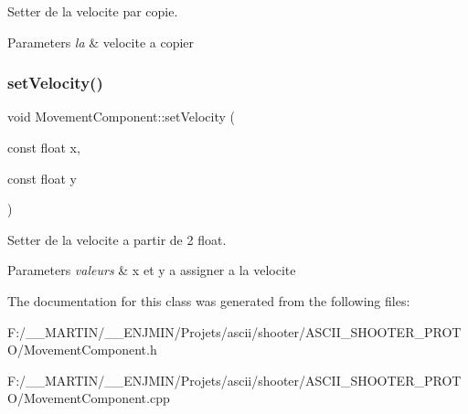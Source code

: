 Setter de la velocite par copie. 


\begin{DoxyParams}{Parameters}
{\em la} & velocite a copier \\
\hline
\end{DoxyParams}
\hypertarget{class_movement_component_add7629692ed68862ff1fd1f3515e2ea6}{}\label{class_movement_component_add7629692ed68862ff1fd1f3515e2ea6} 
\subsubsection{\texorpdfstring{set\+Velocity()}{setVelocity()}\hspace{0.1cm}{\footnotesize\ttfamily [2/2]}}
{\footnotesize\ttfamily void Movement\+Component\+::set\+Velocity (\begin{DoxyParamCaption}\item[{const float}]{x,  }\item[{const float}]{y }\end{DoxyParamCaption})\hspace{0.3cm}{\ttfamily [inline]}}



Setter de la velocite a partir de 2 float. 


\begin{DoxyParams}{Parameters}
{\em valeurs} & x et y a assigner a la velocite \\
\hline
\end{DoxyParams}


The documentation for this class was generated from the following files\+:\begin{DoxyCompactItemize}
\item 
F\+:/\+\_\+\+\_\+\+M\+A\+R\+T\+I\+N/\+\_\+\+\_\+\+E\+N\+J\+M\+I\+N/\+Projets/ascii/shooter/\+A\+S\+C\+I\+I\+\_\+\+S\+H\+O\+O\+T\+E\+R\+\_\+\+P\+R\+O\+T\+O/Movement\+Component.\+h\item 
F\+:/\+\_\+\+\_\+\+M\+A\+R\+T\+I\+N/\+\_\+\+\_\+\+E\+N\+J\+M\+I\+N/\+Projets/ascii/shooter/\+A\+S\+C\+I\+I\+\_\+\+S\+H\+O\+O\+T\+E\+R\+\_\+\+P\+R\+O\+T\+O/Movement\+Component.\+cpp\end{DoxyCompactItemize}
